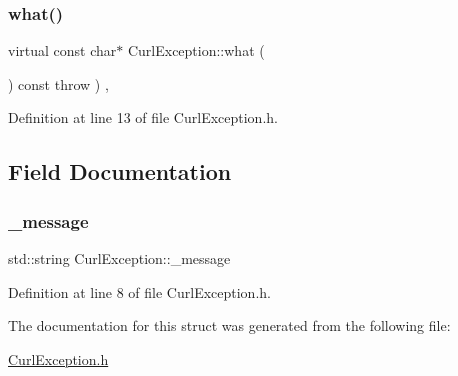 \subsubsection{\texorpdfstring{what()}{what()}}
{\footnotesize\ttfamily virtual const char$\ast$ Curl\+Exception\+::what (\begin{DoxyParamCaption}{ }\end{DoxyParamCaption}) const throw  ) \hspace{0.3cm}{\ttfamily [inline]}, {\ttfamily [virtual]}}



Definition at line 13 of file Curl\+Exception.\+h.



\subsection{Field Documentation}
\mbox{\label{struct_curl_exception_a4b8d06e0dfd0bcd24fd33456c0ec7594}} 
\subsubsection{\texorpdfstring{\+\_\+message}{\_message}}
{\footnotesize\ttfamily std\+::string Curl\+Exception\+::\+\_\+message\hspace{0.3cm}{\ttfamily [private]}}



Definition at line 8 of file Curl\+Exception.\+h.



The documentation for this struct was generated from the following file\+:\begin{DoxyCompactItemize}
\item 
\mbox{\hyperlink{_curl_exception_8h}{Curl\+Exception.\+h}}\end{DoxyCompactItemize}
